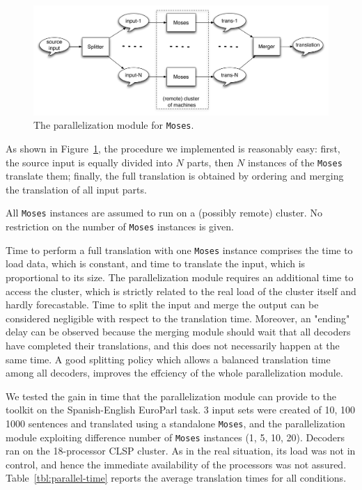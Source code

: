 \documentclass[11pt]{report}
\theoremstyle{plain}
\begin{document}
{\begin{figure}
\begin{center}
 \includegraphics[width=\columnwidth]{Moses-parallel}
\caption{The parallelization module for {\tt Moses}.}
\label{fig:parallel}
\end{center}
 \end{figure}
 
As shown in Figure~\ref{fig:parallel}, the procedure we implemented is reasonably easy:
first, the source input is equally divided into $N$ parts, then $N$ instances of the {\tt Moses} translate them; finally, the full translation is obtained by ordering and merging the translation of all input parts.

All {\tt Moses} instances are assumed to run on a (possibly remote) cluster. No restriction on the number of {\tt Moses} instances is given.


Time to perform a full translation with one {\tt Moses} instance comprises the time to load data, which is constant, and time to translate the input, which is proportional to its size.
The parallelization module requires an additional time to access the cluster, which is strictly related to the real load of the cluster itself and hardly forecastable.
Time to split the input and merge the output can be considered negligible with respect to the translation time.
Moreover, an "ending" delay can be observed because the merging module should wait that all decoders have completed their translations, and this does not necessarily happen at the same time. A good splitting policy which allows a balanced translation time among all decoders,  improves the effciency of the whole parallelization module.

We tested the gain in time that  the parallelization module can provide to the toolkit on the Spanish-English EuroParl task. 3 input sets were created of 10, 100 1000 sentences and translated using a standalone  {\tt Moses}, and the parallelization module exploiting difference number of {\tt Moses} instances (1, 5, 10, 20).
Decoders ran on the 18-processor CLSP cluster. As in the real situation, its load was not in control, and hence the immediate availability of the processors was not assured. Table~\ref{tbl:parallel-time} reports the average translation times for all conditions.

}
\end{document}
